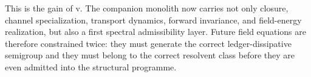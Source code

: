 This is the gain of v\docversion. The companion monolith now carries not only
closure, channel specialization, transport dynamics, forward invariance, and
field-energy realization, but also a first spectral admissibility layer. Future
field equations are therefore constrained twice: they must generate the correct
ledger-dissipative semigroup and they must belong to the correct resolvent class
before they are even admitted into the structural programme.


